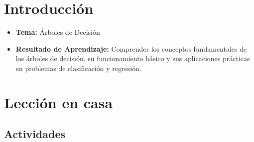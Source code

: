 \documentclass[a4,11pt]{aleph-notas}
\begin{document}
\encabezado


\section*{Introducción}

\begin{itemize}
    \item \textbf{Tema:} Árboles de Decisión
    \item \textbf{Resultado de Aprendizaje:} Comprender los conceptos fundamentales de los árboles de decisión, su funcionamiento básico y sus aplicaciones prácticas en problemas de clasificación y regresión.
\end{itemize}

\section*{Lección en casa}

\subsection*{Actividades}
\end{document}

